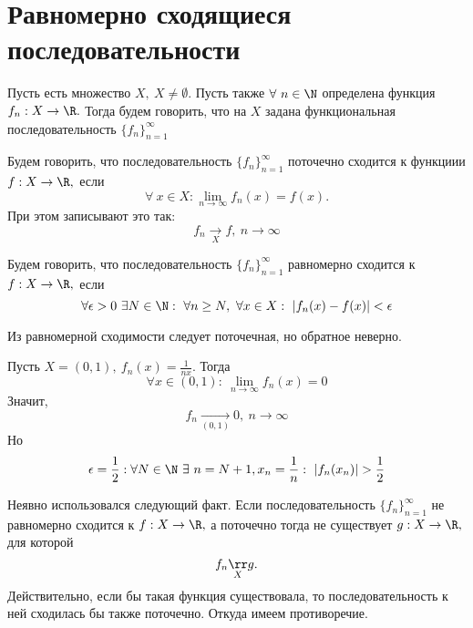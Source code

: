 \section{Равномерно сходящиеся последовательности}

\begin{definition}
    Пусть есть множество $X, \ X \neq \emptyset.$ Пусть также $\forall \ n \in \N$ определена функция $f_n : X \rightarrow \R.$ Тогда будем говорить, что на $X$ задана функциональная последовательность $\{f_n\}_{n = 1}^\infty$
\end{definition}

\begin{definition}
    Будем говорить, что последовательность  $\{f_n\}_{n = 1}^\infty$ поточечно сходится к функциии $f : X \rightarrow \R,$ если
    $$\forall \ x \in X: \lim_{n \rightarrow \infty} f_n(x) = f(x).$$
    При этом записывают это так:
    $$f_n \underset{X}{\rightarrow} f, \ n\rightarrow \infty$$
\end{definition}

\begin{definition}
    Будем говорить, что последовательность  $\{f_n\}_{n = 1}^\infty$ равномерно сходится к $f : X \rightarrow \R,$ если
    $$\forall \epsilon > 0 \ \exists N \in \N: \ \forall n \geq N, \ \forall x \in X: \ |f_n(x) - f(x)| < \epsilon$$
\end{definition}

\begin{note}
    Из равномерной сходимости следует поточечная, но обратное неверно.
\end{note}

\begin{example}
    Пусть $X = (0, 1), \ f_n(x) = \frac{1}{nx}.$ Тогда
    $$\forall x \in (0, 1): \ \lim_{n \rightarrow \infty} f_n(x) = 0$$
    Значит, $$f_n \underset{(0, 1)}{\rightarrow} 0, \ n\rightarrow \infty$$
    Но $$\epsilon = \frac{1}{2}: \forall N \in \N \ \exists \ n = N + 1, x_n = \frac{1}{n}: \ |f_n(x_n)| > \frac{1}{2}$$
\end{example}

\begin{note}
    Неявно использовался следующий факт. Если последовательность  $\{f_n\}_{n = 1}^\infty$ не равномерно сходится к $f : X \rightarrow \R,$ а поточечно тогда не существует $g: X \rightarrow \R,$ для которой $$f_n \underset{X}{\rr} g.$$ Действительно, если бы такая функция существовала, то последовательность к ней сходилась бы также поточечно. Откуда имеем противоречие.
\end{note}

